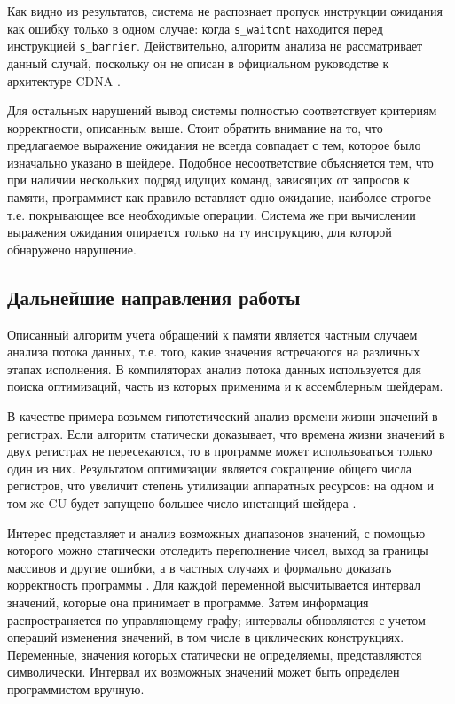 \documentclass[a4paper,14pt]{extarticle}
\begin{document}
{Как видно из результатов, система не распознает пропуск инструкции ожидания как ошибку только
в одном случае: когда \verb|s_waitcnt| находится перед инструкцией \verb|s_barrier|. Действительно,
алгоритм анализа не рассматривает данный случай, поскольку он не описан в официальном руководстве
к архитектуре CDNA \cite{cdna-isa}.

Для остальных нарушений вывод системы полностью соответствует критериям корректности, описанным
выше. Стоит обратить внимание на то, что предлагаемое выражение ожидания не всегда совпадает
с тем, которое было изначально указано в шейдере. Подобное несоответствие объясняется тем,
что при наличии нескольких подряд идущих команд, зависящих от запросов к памяти,
программист как правило вставляет одно ожидание, наиболее строгое — т.е. покрывающее все
необходимые операции. Система же при вычислении выражения ожидания опирается только
на ту инструкцию, для которой обнаружено нарушение.

\subsection{Дальнейшие направления работы}
\label{section:future-work}

Описанный алгоритм учета обращений к памяти является частным случаем анализа потока данных,
т.е. того, какие значения встречаются на различных этапах исполнения. В компиляторах
анализ потока данных используется для поиска оптимизаций, часть из которых применима и к
ассемблерным шейдерам.

В качестве примера возьмем гипотетический анализ времени жизни значений в регистрах. Если алгоритм
статически доказывает, что времена жизни значений в двух регистрах не пересекаются, то
в программе может использоваться только один из них. Результатом оптимизации
является сокращение общего числа регистров, что увеличит степень утилизации аппаратных ресурсов:
на одном и том же CU будет запущено большее число инстанций шейдера \cite{gcn-performance}.

Интерес представляет и анализ возможных диапазонов значений, с помощью которого можно
статически отследить переполнение чисел, выход за границы массивов и другие ошибки,
а в частных случаях и формально доказать корректность программы \cite{value-range-analysis}.
Для каждой переменной высчитывается интервал значений, которые она принимает в программе.
Затем информация распространяется по управляющему графу; интервалы обновляются с
учетом операций изменения значений, в том числе в циклических конструкциях.
Переменные, значения которых статически не определяемы, представляются символически.
Интервал их возможных значений может быть определен программистом вручную.

}
\end{document}
